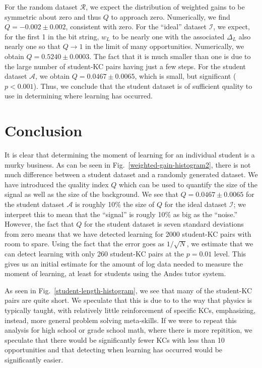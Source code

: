 \documentclass{acmlarge-edm}
\begin{document}
For the random dataset $\mathcal{R}$, we expect the distribution of
weighted gains to be symmetric about zero and thus $Q$ to approach
zero.  Numerically, we find $Q=-0.002\pm0.002$, consistent with zero.
For the ``ideal'' dataset $\mathcal{I}$, we expect, for the first 1 in
the bit string, $w_L$ to be nearly one with the associated $\Delta_L$
also nearly one so that $Q\to 1$ in the limit of many opportunities.
Numerically, we obtain $Q=0.5240\pm0.0003$.  The fact that it is much
smaller than one is due to the large number of student-KC pairs having
just a few steps.  For the student dataset $\mathcal{A}$, we obtain
$Q=0.0467\pm0.0065$, which is small, but significant
($p<0.001$). Thus, we conclude that the student dataset is of
sufficient quality to use in determining where learning has occurred.


\section{Conclusion}

It is clear that determining the moment of learning for an
individual student is a murky business.  As can be seen in
Fig.~\ref{weighted-gain-histogram2}, there is not much difference
between a student dataset and a randomly generated dataset.  We have
introduced the quality index $Q$ which can be used to quantify the
size of the signal as well as the size of the background.  We see that
$Q=0.0467\pm0.0065$ for the student dataset $\mathcal{A}$ is roughly
10\% the size of $Q$ for the ideal dataset $\mathcal{I}$; we interpret
this to mean that the ``signal'' is rougly 10\% as big as the
``noise.''  However, the fact that $Q$ for the student dataset is
seven standard deviations from zero means that we have detected
learning for 2000 student-KC pairs with room to spare.  Using the fact
that the error goes as $1/\sqrt{N}$, we estimate
that we can detect learning with only 260 student-KC pairs at the
$p=0.01$ level.  This gives us an initial estimate for the amount of
log data needed to measure the moment of learning, at least for
students using the Andes tutor system.

As seen in Fig.~\ref{student-length-histogram}, we see that many of
the student-KC pairs are quite short.  We speculate that this
is due to to the way that physics is typically taught, with relatively
little reinforcement of specific KCs, emphasizing, instead, more
general problem solving meta-skills.  If we were to repeat this
analysis for high school or grade school math, where there is more
repitition, we speculate that there would be significantly fewer KCs
with less than 10 opportunities and that detecting when learning has
occurred would be significantly easier.




\end{document}
